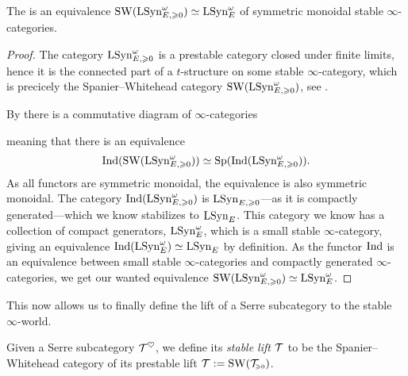 \begin{theorem}
    \label{ch3:add:thm:prestable-freyd-stabilizes-to-stable-Freyd}
    The is an equivalence $\operatorname{SW}(\mathrm{LSyn}_{E, \geqslant 0}^\omega)\simeq \mathrm{LSyn}_{E}^\omega$ of symmetric monoidal stable $\infty$-categories.  
\end{theorem}
\begin{proof}
    The category $\mathrm{LSyn}_{E, \geqslant 0}^\omega$ is a prestable category closed under finite limits, hence it is the connected part of a $t$-structure on some stable $\infty$-category, which is precicely the Spanier--Whitehead category $\operatorname{SW}(\mathrm{LSyn}_{E, \geqslant 0}^\omega)$, see \cite[C.1.1, C.1.2]{lurie_SAG}. 

    By \cite[C.1.1.6]{lurie_SAG} there is a commutative diagram of $\infty$-categories
    \begin{center}
    \end{center}
    meaning that there is an equivalence
    \[\operatorname{Ind}(\operatorname{SW}(\mathrm{LSyn}_{E, \geqslant 0}^\omega))\simeq \mathrm{Sp}(\operatorname{Ind}(\mathrm{LSyn}_{E, \geqslant 0}^\omega)).\]
    As all functors are symmetric monoidal, the equivalence is also symmetric monoidal. The category $\operatorname{Ind}(\mathrm{LSyn}_{E, \geqslant 0}^\omega)$ is $\mathrm{LSyn}_{E, \geqslant 0}$---as it is compactly generated---which we know stabilizes to $\mathrm{LSyn}_{E}$. This category we know has a collection of compact generators, $\mathrm{LSyn}_{E}^\omega$, which is a small stable $\infty$-category, giving an equivalence $\operatorname{Ind}(\mathrm{LSyn}_{E}^\omega)\simeq \mathrm{LSyn}_{E}$ by definition. As the functor $\operatorname{Ind}$ is an equivalence between small stable $\infty$-categories and compactly generated $\infty$-categories, we get our wanted equivalence $\operatorname{SW}(\mathrm{LSyn}_{E, \geqslant 0}^\omega)\simeq \mathrm{LSyn}_{E}^\omega$. 
\end{proof}

This now allows us to finally define the lift of a Serre subcategory to the stable $\infty$-world. 

\begin{definition}
    Given a Serre subcategory $\mathcal{T}^\heartsuit$, we define its \emph{stable lift} $\mathcal{T}$ to be the Spanier--Whitehead category of its prestable lift $\mathcal{T}:= \operatorname{SW}(\mathcal{T}_{\hspace{-1pt}\scriptscriptstyle\geqslant 0})$. 
\end{definition}

